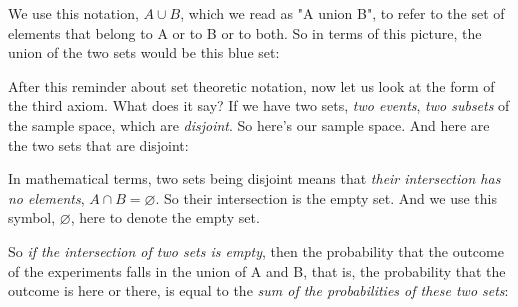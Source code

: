 \documentclass[pdftex, brazil, 12pt, twoside]{article}
\begin{document}
We use this notation, $A \cup B$, which we read as "A union B", to refer
to the set of elements that belong to A
or to B or to both. So in terms of this picture, the union of the two sets
would be this blue set:

\begin{figure}[H]
  \begin{center}
  \end{center}
\end{figure}

After this reminder about set theoretic notation, now let us
look at the form of the third axiom.
What does it say?
If we have two sets, \emph{two events}, \emph{two subsets} of the
sample space, which are \emph{disjoint}.
So here's our sample space.
And here are the two sets that are disjoint:

\begin{figure}[H]
  \begin{center}
  \end{center}
\end{figure}

In mathematical terms, two sets being disjoint means that
\emph{their intersection has no elements}, $A \cap B = \varnothing$.
So their intersection is the empty set.
And we use this symbol, $\varnothing$, here to denote the empty set.

So \emph{if the intersection of two sets is empty}, then the
probability that the outcome of the experiments falls in
the union of A and B, that is, the probability that the
outcome is here or there, is equal to the \emph{sum of the
probabilities of these two sets}:

\begin{figure}[H]
  \begin{center}
  \end{center}
\end{figure}
\end{document}
